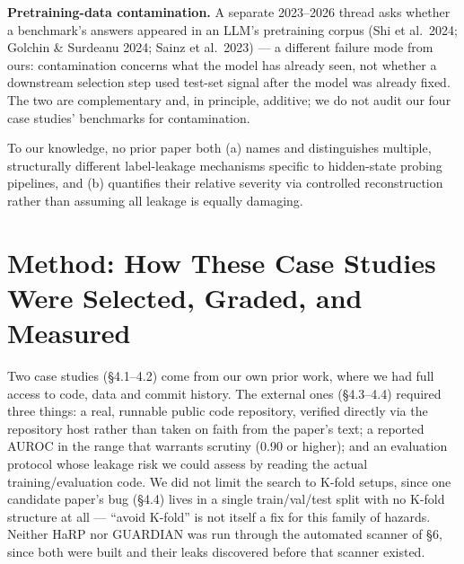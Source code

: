 \documentclass[10pt]{article} %
\begin{document}
\textbf{Pretraining-data contamination.} A separate 2023--2026 thread asks
whether a benchmark's answers appeared in an LLM's pretraining corpus (Shi et
al.\ 2024; Golchin \& Surdeanu 2024; Sainz et al.\ 2023) --- a different failure
mode from ours: contamination concerns what the model has already seen, not
whether a downstream selection step used test-set signal after the model was
already fixed. The two are complementary and, in principle, additive; we do not
audit our four case studies' benchmarks for contamination.

To our knowledge, no prior paper both (a) names and distinguishes multiple,
structurally different label-leakage mechanisms specific to hidden-state
probing pipelines, and (b) quantifies their relative severity via controlled
reconstruction rather than assuming all leakage is equally damaging.

\section{Method: How These Case Studies Were Selected, Graded, and Measured}

Two case studies (§4.1--4.2) come from our own prior work, where we had full
access to code, data and commit history. The external ones (§4.3--4.4) required
three things: a real, runnable public code repository, verified directly via
the repository host rather than taken on faith from the paper's text; a
reported AUROC in the range that warrants scrutiny (0.90 or higher); and an
evaluation protocol whose leakage risk we could assess by reading the actual
training/evaluation code. We did not limit the search to K-fold setups, since
one candidate paper's bug (§4.4) lives in a single train/val/test split with no
K-fold structure at all --- ``avoid K-fold'' is not itself a fix for this
family of hazards. Neither HaRP nor GUARDIAN was run through the automated
scanner of §6, since both were built and their leaks discovered before that
scanner existed.
\end{document}
